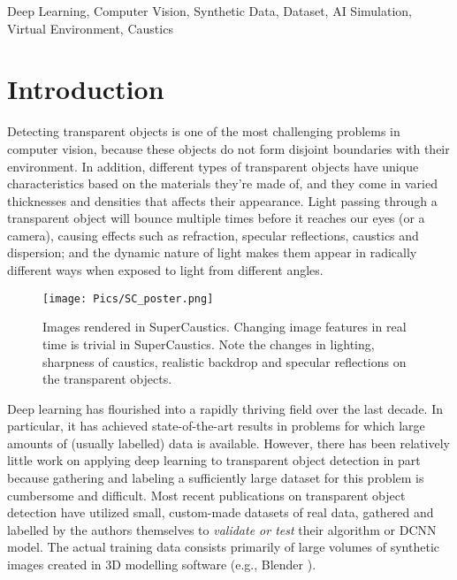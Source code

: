 \documentclass[conference]{IEEEtran}
\begin{document}
\begin{IEEEkeywords}
Deep Learning, Computer Vision, Synthetic Data, Dataset, AI Simulation, Virtual Environment, Caustics
\end{IEEEkeywords}

\section{Introduction}
Detecting transparent objects is one of the most challenging problems in computer vision, because these objects do not form disjoint boundaries with their environment. In addition, different types of transparent objects have unique characteristics based on the materials they're made of, and they come in varied thicknesses and densities that affects their appearance. Light passing through a transparent object will bounce multiple times before it reaches our eyes (or a camera), causing effects such as refraction, specular reflections, caustics and dispersion; and the dynamic nature of light makes them appear in radically different ways when exposed to light from different angles.

\begin{figure}

 \center
  \texttt{[image: Pics/SC\_poster.png]}
  \caption{Images rendered in SuperCaustics. Changing image features in real time is trivial in SuperCaustics. Note the changes in lighting, sharpness of caustics, realistic backdrop and specular reflections on the transparent objects.} 

  \label{teas}

\end{figure}

Deep learning has flourished into a rapidly thriving field over the last decade. In particular, it has achieved state-of-the-art results in problems for which large amounts of (usually labelled) data is available. However, there has been relatively little work on applying deep learning to transparent object detection in part because gathering and labeling a sufficiently large dataset for this problem is cumbersome and difficult. Most recent publications on transparent object detection have utilized small, custom-made datasets of real data, gathered and labelled by the authors themselves to \textit{validate or test} their algorithm or DCNN model. The actual training data consists primarily of large volumes of synthetic images created in 3D modelling software (e.g., Blender \cite{blender}).
\end{document}
